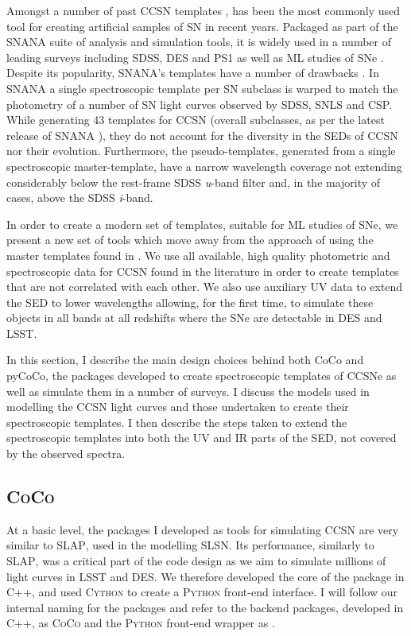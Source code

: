 Amongst a number of past CCSN templates \citep{Schlegel1995,Nugent2006}, \citet{Kessler2009} has been the most commonly used tool for creating artificial samples of SN in recent years. Packaged as part of the \textsc{SNANA} suite of analysis and simulation tools, it is widely used in a number of leading surveys including SDSS, DES and PS1 as well as ML studies of SNe \citep{Kessler2010,Lochner2016}. Despite its popularity, \textsc{SNANA}'s templates have a number of drawbacks \citep{Kessler2010}. In \textsc{SNANA} a single spectroscopic template per SN subclass \citep[Taken from][]{Nugent2006} is warped to match the photometry of a number of SN light curves observed by SDSS, SNLS and CSP. While generating 43 templates for CCSN (overall subclasses, as per the latest release of \textsc{SNANA} \citep{Jones2017}), they do not account for the diversity in the SEDs of CCSN nor their evolution. Furthermore, the pseudo-templates, generated from a single spectroscopic master-template, have a narrow wavelength coverage not extending considerably below the rest-frame SDSS \textit{u}-band filter and, in the majority of cases, above the SDSS \textit{i}-band.

In order to create a modern set of templates, suitable for ML studies of SNe, we present a new set of tools which move away from the approach of using the master templates found in \citet{Nugent2006}. We use all available, high quality photometric and spectroscopic data for CCSN found in the literature in order to create templates that are not correlated with each other. We also use auxiliary UV data to extend the SED to lower wavelengths allowing, for the first time, to simulate these objects in all bands at all redshifts where the SNe are detectable in DES and LSST.

In this section, I describe the main design choices behind both CoCo and pyCoCo, the packages developed to create spectroscopic templates of CCSNe as well as simulate them in a number of surveys. I discuss the models used in modelling the CCSN light curves and those undertaken to create their spectroscopic templates. I then describe the steps taken to extend the spectroscopic templates into both the UV and IR parts of the SED, not covered by the observed spectra.

\subsection{\textsc{CoCo}}
At a basic level, the packages I developed as tools for simulating CCSN are very similar to \textsc{SLAP}, used in the modelling SLSN. Its performance, similarly to \textsc{SLAP}, was a critical part of the code design as we aim to simulate millions of light curves in LSST and DES. We therefore developed the core of the package in \textsc{C++}, and used \textsc{Cython} to create a \textsc{Python} front-end interface. I will follow our internal naming for the packages and refer to the backend packages, developed in \textsc{C++}, as \textsc{CoCo} and the \textsc{Python} front-end wrapper as .

